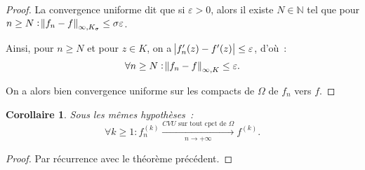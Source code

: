 \documentclass{report}
\newtheorem{cor}[thm]{Corollaire}
\theoremstyle{definition}
\theoremstyle{remark}
\numberwithin{equation}{section}
\newcommand{\N}{\mathbb N}
\newcommand{\CONV}[5]{\xrightarrow[#2 \to #3]{#4 \text{ #5 } #1}}
\newcommand{\CVUc}[3]{\CONV{#1}{#2}{#3}{CVU}{sur tout cpct de}}
\newcommand{\pinfty}{{+\infty}}
\begin{document}
\begin{proof}
			La convergence uniforme dit que si $\varepsilon > 0$, alors il existe $N \in \N$ tel que pour
			$n \geq N : \norm {f_n-f}_{\infty, K_\sigma} \leq \sigma\varepsilon$.

			Ainsi, pour $n \geq N$ et pour $z \in K$, on a $\abs {f_n'(z)-f'(z)} \leq \varepsilon$, d'où~:
			\begin{equation}
				\forall n \geq N : \norm {f_n-f}_{\infty, K} \leq \varepsilon.
			\end{equation}

			On a alors bien convergence uniforme sur les compacts de $\Omega$ de $f_n$ vers $f$.
			\end{proof}

			\begin{cor} Sous les mêmes hypothèses~:
			\begin{equation}
				\forall k \geq 1 : f_n^{(k)} \CVUc \Omega n\pinfty f^{(k)}.
			\end{equation}
			\end{cor}

			\begin{proof} Par récurrence avec le théorème précédent.
			\end{proof}
\end{document}
